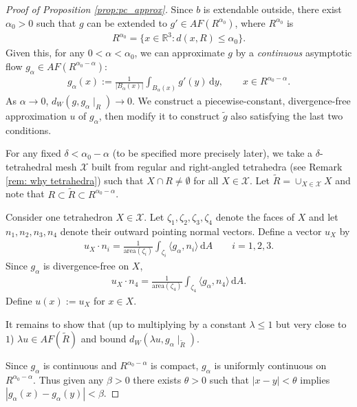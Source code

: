 \documentclass[11pt]{article}
\theoremstyle{remark}
\theoremstyle{definition}
\newcommand{\mc}[1]{\mathcal{#1}}
\newcommand{\dd}{\mathrm{d}}
\begin{document}
\begin{proof}[Proof of Proposition \ref{prop:pc_approx}]

    Since $b$ is extendable outside, there exist $\alpha_0>0$ such that $g$ can be extended to $g'\in AF(R^{\alpha_0})$, where $R^{\alpha_0}$ is
    \begin{align*}
        R^{\alpha_0} = \{x\in \mathbb R^3 : d(x,R)\leq \alpha_0\}. 
    \end{align*}
    Given this, for any $0<\alpha<\alpha_0$, we can approximate $g$ by a \textit{continuous} asymptotic flow $g_\alpha\in AF(R^{\alpha_0-\alpha})$:
    \begin{align*}
        g_\alpha(x) := \frac{1}{|B_\alpha(x)|} \int_{B_\alpha(x)} g'(y) \, \dd y, \qquad x\in R^{\alpha_0-\alpha}.
    \end{align*}
    As $\alpha\to 0$, $d_W(g,g_\alpha\mid_{R})\to 0$. We construct a piecewise-constant, divergence-free approximation $u$ of $g_\alpha$, then modify it to construct $\widetilde{g}$ also satisfying the last two conditions. 
        
    For any fixed $\delta<\alpha_0-\alpha$ (to be specified more precisely later), we take a $\delta$-tetrahedral mesh $\mc X$ built from regular and right-angled tetrahedra (see Remark \ref{rem: why tetrahedra}) such that $X\cap R\neq \emptyset$ for all $X\in \mc X$. Let $\widetilde{R} = \cup_{X\in \mc X} X$ and note that $R\subset \widetilde{R} \subset R^{\alpha_0-\alpha}$. 
  
    Consider one tetrahedron $X\in \mc X$. Let $\zeta_1,\zeta_2,\zeta_3,\zeta_4$ denote the faces of $X$ and let $n_1,n_2,n_3,n_4$ denote their outward pointing normal vectors. Define a vector $u_X$ by 
    \begin{align*}
        u_X \cdot n_i = \frac{1}{\text{area}(\zeta_i)} \int_{\zeta_i} \langle g_\alpha, n_i\rangle \, \dd A \qquad i = 1,2,3.
    \end{align*}
    Since $g_\alpha$ is divergence-free on $X$, 
    \begin{align*}
        u_X \cdot n_4 = \frac{1}{\text{area}(\zeta_4)} \int_{\zeta_4}\langle g_\alpha,n_4\rangle \,\dd A.
    \end{align*}
    Define $u(x):= u_X$ for $x\in X$.

    It remains to show that (up to multiplying by a constant $\lambda\leq 1$ but very close to $1$) $\lambda u\in AF(\widetilde R)$ and bound $d_W(\lambda u, g_\alpha\mid_{\widetilde{R}})$. 

    Since $g_\alpha$ is continuous and ${R}^{\alpha_0-\alpha}$ is compact, $g_\alpha$ is uniformly continuous on $R^{\alpha_0-\alpha}$. Thus given any $\beta>0$ there exists $\theta>0$ such that $|x-y|<\theta$ implies $|g_\alpha(x)-g_\alpha(y)|<\beta$. 


\end{proof}
\end{document}

